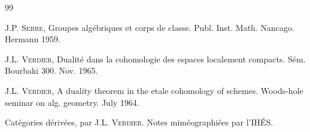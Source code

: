 \documentclass[10pt]{../fichiers-configuration-latex/smfart}
\begin{document}
\begin{thebibliography}{99}

 J.P. \textsc{Serre}, Groupes algébriques et corps de
classe. Publ. Inst. Math. Nancago. Hermann 1959.

 J.L. \textsc{Verdier}, Dualité dans la cohomologie des espaces
localement compacts. Sém. Bourbaki 300. Nov. 1965.

 J.L. \textsc{Verdier}, A duality theorem in the etale
  cohomology of schemes. Woods-hole seminar on alg. geometry. July 1964.

 Catégories dérivées, par J.L. \textsc{Verdier}. Notes
miméographiées par l'IHÉS.

\end{thebibliography}



\ifx\danslelivre\undefined
\end{document}
